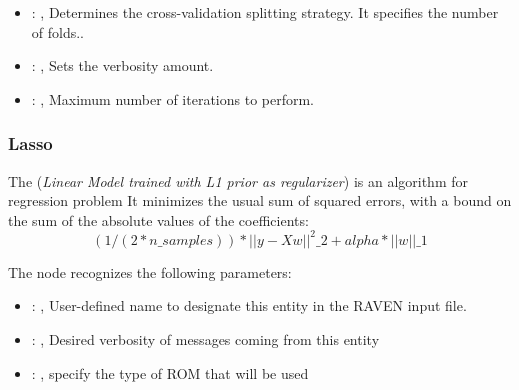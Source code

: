 \begin{itemize}
    \item {}: , 
      Determines the cross-validation splitting strategy.
      It specifies the number of folds..

    \item {}: , 
      Sets the verbosity amount.

    \item {}: , 
      Maximum number of iterations to perform.
  \end{itemize}


\subsubsection{Lasso}
  The  (\textit{Linear Model trained with L1 prior as regularizer})
  is an algorithm for regression problem                         It minimizes the usual sum of
  squared errors, with a bound on the sum of the                         absolute values of the
  coefficients:                         \begin{equation}                          (1 / (2 *
  n\_samples)) * ||y - Xw||^2\_2 + alpha * ||w||\_1                         \end{equation}

  The  node recognizes the following parameters:
    \begin{itemize}
      \item {}: , 
        User-defined name to designate this entity in the RAVEN input file.
      \item {}: , 
        Desired verbosity of messages coming from this entity
      \item {}: , 
        specify the type of ROM that will be used
  \end{itemize}

